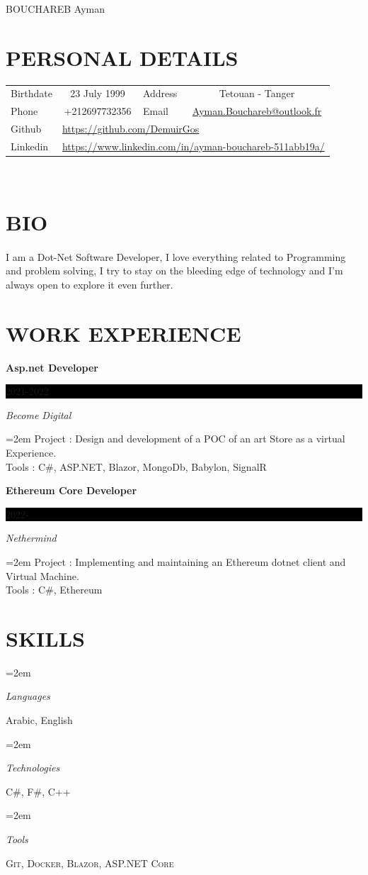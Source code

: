 \documentclass[paper=a4,fontsize=11pt]{scrartcl} %
\newlength{\spacebox}
\newcommand{\sepspace}{\vspace*{1em}}		%
\newcommand{\MyName}[1]{ %
		\Huge \usefont{OT1}{phv}{b}{n} \hfill #1
		\par \normalsize \normalfont}
\newcommand{\NewPart}[1]{\section*{\uppercase{#1}}}
\newcommand{\SkillsEntry}[2]{      %
		\noindent\hangindent=2em\hangafter=0 %
		\parbox{\spacebox}{        %
		\textit{#1}}			   %
		\hspace{1.5em} #2 \par}    %
\newcommand{\EducationEntry}[4]{
		\noindent \textbf{#1} \hfill      %
		\colorbox{Black}{%
			\parbox{6em}{%
			\hfill\color{White}#2}} \par  %
		\noindent \textit{#3} \par        %
		\noindent\hangindent=2em\hangafter=0 \small #4 %
		\normalsize \par}
\begin{document}
\MyName{BOUCHAREB Ayman }

\sepspace

\NewPart{Personal Details}{}
\begin{tabular}{ c c c c }
 \multicolumn{1}{l}{Birthdate} & 23 July 1999} &  \multicolumn{1}{l}{Address} & Tetouan - Tanger \\  
 \multicolumn{1}{l}{Phone} & +212697732356 & 
 \multicolumn{1}{l}{Email} & \url{Ayman.Bouchareb@outlook.fr} \\
 \multicolumn{1}{l}{Github} & \multicolumn{3}{l}{\url{https://github.com/DemuirGos}} \\
 \multicolumn{1}{l}{Linkedin} & \multicolumn{3}{l}{\url{https://www.linkedin.com/in/ayman-bouchareb-511abb19a/}}
\end{tabular}\\

\NewPart{Bio}{}

\paragraph{}{I am a Dot-Net Software Developer, I love everything related to Programming and problem solving, I try to stay on the bleeding edge of technology and I'm always open to explore it even further.}

\NewPart{Work Experience}{}

\EducationEntry{Asp.net Developer}{2021-2022}{Become Digital}{Project : Design and development of a POC of an art Store as a virtual Experience.\\
Tools : C\#, ASP.NET, Blazor, MongoDb, Babylon, SignalR}

\EducationEntry{Ethereum Core Developer}{2022-}{Nethermind}{Project : Implementing and maintaining an Ethereum dotnet client and Virtual Machine.\\
Tools : C\#, Ethereum}

\NewPart{Skills}{}

\SkillsEntry{Languages}{Arabic, English}

\SkillsEntry{Technologies}{\textsc{C\#},  \textsc{F\#}, \textsc{C++}}
\SkillsEntry{Tools}{\textsc{Git},  \textsc{Docker}, \textsc{Blazor}, \textsc{ASP.NET Core}}
\end{document}
